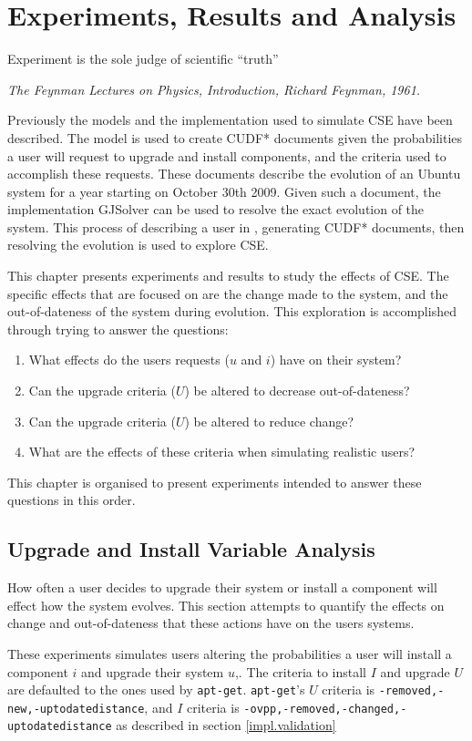 
\chapter{Experiments, Results and Analysis}
\label{experiments}
\epigraph{Experiment is the sole judge of scientific ``truth''}
{\textit{The Feynman Lectures on Physics, Introduction, Richard Feynman, 1961.}}
Previously the models and the implementation used to simulate CSE have been described.
The \usermodel model is used to create CUDF* documents given the probabilities a user will request to upgrade and install components, 
and the criteria used to accomplish these requests.
These documents describe the evolution of an Ubuntu system for a year starting on October 30th 2009.
Given such a document, the implementation GJSolver can be used to resolve the exact evolution of the system.
This process of describing a user in \usermodel, generating CUDF* documents, then resolving the evolution is used to explore CSE.

This chapter presents experiments and results to study the effects of CSE.
The specific effects that are focused on are the change made to the system, and the out-of-dateness of the system during evolution.
This exploration is accomplished through trying to answer the questions:
\begin{enumerate}
  \item What effects do the users requests ($u$ and $i$) have on their system?
  \item Can the upgrade criteria ($U$) be altered to decrease out-of-dateness?
  \item Can the upgrade criteria ($U$) be altered to reduce change?
  \item What are the effects of these criteria when simulating realistic users?
\end{enumerate}
This chapter is organised to present experiments intended to answer these questions in this order. 

\section{Upgrade and Install Variable Analysis}
How often a user decides to upgrade their system or install a component will effect how the system evolves.
This section attempts to quantify the effects on change and out-of-dateness that these actions have on the users systems.

These experiments simulates users altering the probabilities a user will install a component $i$ and upgrade their system $u$,.
The criteria to install $I$ and upgrade $U$ are defaulted to the ones used by \texttt{apt-get}. 
\texttt{apt-get}'s $U$ criteria is \texttt{-removed,-new,-uptodatedistance}, and $I$ criteria is \texttt{-ovpp,-removed,-changed,-uptodatedistance} as described in section \ref{impl.validation} 

